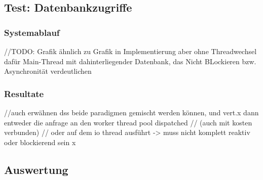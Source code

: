 \subsection{Test: Datenbankzugriffe}
\label{section:datenbankzugriffe}

\subsubsection{Systemablauf}
//TODO: Grafik ähnlich zu Grafik in Implementierung aber ohne Threadwechsel dafür Main-Thread mit dahinterliegender Datenbank,
das Nicht BLockieren bzw. Asynchronität verdeutlichen

\subsubsection{Resultate}

//auch erwähnen dss beide paradigmen gemischt werden können, und vert.x dann entweder die anfrage an den worker thread pool dispatched
// (auch mit kosten verbunden)
// oder auf dem io thread ausführt -> muss nicht komplett reaktiv oder blockierend sein x
\subsection{Auswertung}
\label{section:auswertung}